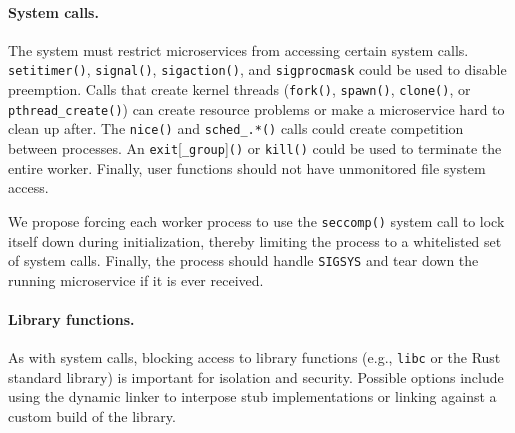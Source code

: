
\paragraph{System calls.}
The system must restrict microservices from accessing certain system calls.
\texttt{setitimer()}, \texttt{signal()}, \texttt{sigaction()}, and
\texttt{sigprocmask} could be used to
disable preemption.  Calls that create
kernel threads (\texttt{fork()}, \texttt{spawn()}, \texttt{clone()},
or \texttt{pthread\_create()}) can create resource problems or make a
microservice hard to clean up after.
The \texttt{nice()} and \texttt{sched\_.*()} calls could
create competition between processes.
An \texttt{exit}[\texttt{\_group}]\texttt{()} or \texttt{kill()} could
be used to terminate the entire worker.
Finally, user functions should not have unmonitored file system access.

We propose forcing each worker process to use the \texttt{seccomp()} system call
to lock itself down during initialization, thereby limiting the process to a
whitelisted set of system calls.  Finally, the process
should handle \texttt{SIGSYS} and tear down the running microservice if it is
ever received.

\paragraph{Library functions.}
As with system calls, blocking access to library functions (e.g., \texttt{libc}
or the Rust standard library) is important for isolation and security.  Possible
options include using the dynamic linker to interpose stub implementations or
linking against a custom build of the library.

